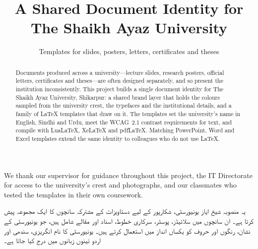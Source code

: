 \documentclass[degree=bs,bib=ieee]{saus-thesis}
\title{A Shared Document Identity for The Shaikh Ayaz University}
\subtitle{Templates for slides, posters, letters, certificates and theses}
\begin{document}
\makecover            %
\frontmatter
\maketitlepage
\makeapproval
\makedeclaration
\dedication{To the teachers of Shikarpur.}

\begin{acknowledgements}
We thank our supervisor for guidance throughout this project, the IT Directorate
for access to the university's crest and photographs, and our classmates who
tested the templates in their own coursework.
\end{acknowledgements}

\begin{abstract}
Documents produced across a university---lecture slides, research posters,
official letters, certificates and theses---are often designed separately, and
so present the institution inconsistently. This project builds a single
document identity for The Shaikh Ayaz University, Shikarpur: a shared brand
layer that holds the colours sampled from the university crest, the typefaces
and the institutional details, and a family of \LaTeX{} templates that draw on
it. The templates set the university's name in English, Sindhi and Urdu, meet
the WCAG~2.1 contrast requirements for text, and compile with LuaLaTeX,
XeLaTeX and pdfLaTeX. Matching PowerPoint, Word and Excel templates extend the
same identity to colleagues who do not use \LaTeX{}.
\end{abstract}

\begin{urduabstract}
یہ منصوبہ شیخ ایاز یونیورسٹی، شکارپور کے لیے دستاویزات کے مشترکہ سانچوں کا ایک
مجموعہ پیش کرتا ہے۔ ان سانچوں میں سلائیڈز، پوسٹر، سرکاری خطوط، اسناد اور مقالے
شامل ہیں، جو یونیورسٹی کے نشان، رنگوں اور حروف کو یکساں انداز میں استعمال کرتے ہیں۔
یونیورسٹی کا نام انگریزی، سندھی اور اردو تینوں زبانوں میں درج کیا جاتا ہے۔
\end{urduabstract}

\tableofcontents
\listoffigures
\listoftables
\lstlistoflistings

\begin{abbreviations}
\end{abbreviations}

\mainmatter

\end{document}
